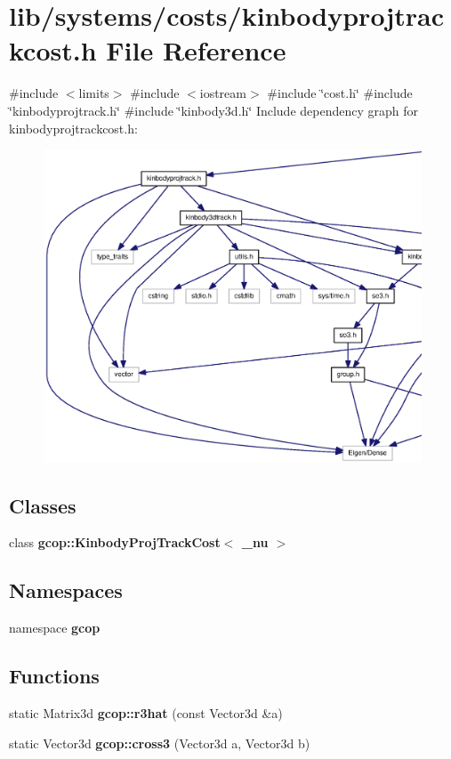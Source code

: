 \section{lib/systems/costs/kinbodyprojtrackcost.h \-File \-Reference}
\label{kinbodyprojtrackcost_8h}
{\ttfamily \#include $<$limits$>$}\*
{\ttfamily \#include $<$iostream$>$}\*
{\ttfamily \#include \char`\"{}cost.\-h\char`\"{}}\*
{\ttfamily \#include \char`\"{}kinbodyprojtrack.\-h\char`\"{}}\*
{\ttfamily \#include \char`\"{}kinbody3d.\-h\char`\"{}}\*
\-Include dependency graph for kinbodyprojtrackcost.\-h\-:
\nopagebreak
\begin{figure}[H]
\begin{center}
\leavevmode
\includegraphics[width=350pt]{kinbodyprojtrackcost_8h__incl}
\end{center}
\end{figure}
\subsection*{\-Classes}
\begin{DoxyCompactItemize}
\item 
class {\bf gcop\-::\-Kinbody\-Proj\-Track\-Cost$<$ \-\_\-nu $>$}
\end{DoxyCompactItemize}
\subsection*{\-Namespaces}
\begin{DoxyCompactItemize}
\item 
namespace {\bf gcop}
\end{DoxyCompactItemize}
\subsection*{\-Functions}
\begin{DoxyCompactItemize}
\item 
static \-Matrix3d {\bf gcop\-::r3hat} (const \-Vector3d \&a)
\item 
static \-Vector3d {\bf gcop\-::cross3} (\-Vector3d a, \-Vector3d b)
\end{DoxyCompactItemize}
